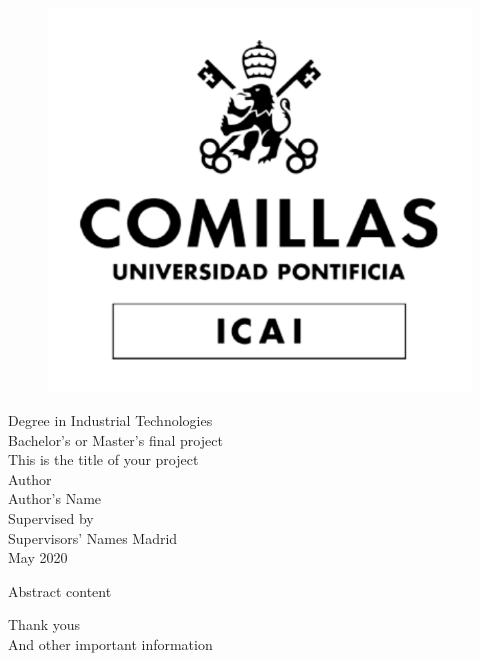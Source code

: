 \documentclass[12pt, a4paper]{book} %
\newenvironment{abstract}%
{\cleardoublepage \null \vfill \begin{center}%
		\bfseries \abstractname \end{center}}%
{\vfill\null}
\begin{document}
	\frontmatter %
	\pagestyle{empty} %

	\begin{titlepage}
		\begin{figure}
			\centering
			\includegraphics[width=0.3\linewidth]{LogoUniversidadBN}
		\end{figure}
		\centering
		\Large Degree in Industrial Technologies \\ %
		\vspace*{2.5em} %
		\centering
		Bachelor's or Master's final project \\ %
		\vspace*{1em}
		This is the title of your project %
		\\ \large
		\vspace*{3em}
		Author \\ Author's Name \\ %
		\vspace*{1em}
		Supervised by \\ Supervisors' Names %
		\vfill
		Madrid \\
		May 2020 %
	\end{titlepage}

	\begin{abstract}
		Abstract content
	\end{abstract}

	\newpage

	{\centering Thank yous\\}
	\vfill %
	And other important information
\end{document}

